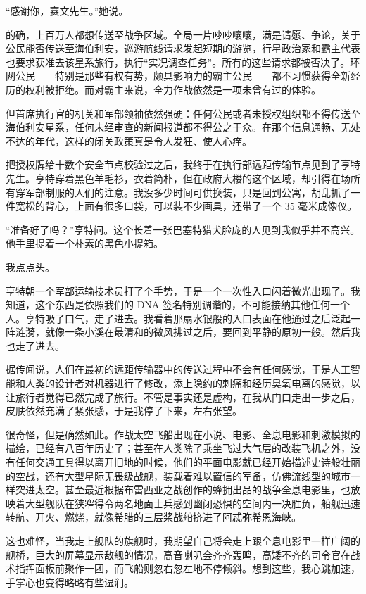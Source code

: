 \documentclass[AutoFakeBold=true]{book}
\begin{document}
``感谢你，赛文先生。''她说。

\vspace*{1em}

的确，上百万人都想传送至战争区域。全局一片吵吵嚷嚷，满是请愿、争论，关于公民能否传送至海伯利安，巡游航线请求发起短期的游览，行星政治家和霸主代表也要求获准去该星系旅行，执行``实况调查任务''。所有的这些请求都被否决了。环网公民——特别是那些有权有势，颇具影响力的霸主公民——都不习惯获得全新经历的权利被拒绝。而对霸主来说，全力作战依然是一项未曾有过的体验。

但首席执行官的机关和军部领袖依然强硬：任何公民或者未授权组织都不得传送至海伯利安星系，任何未经审查的新闻报道都不得公之于众。在那个信息通畅、无处不达的年代，这样的闭关政策真是令人发狂、使人心痒。

把授权牌给十数个安全节点校验过之后，我终于在执行部远距传输节点见到了亨特先生。亨特穿着黑色羊毛衫，衣着简朴，但在政府大楼的这个区域，却引得在场所有穿军部制服的人们的注意。我没多少时间可供换装，只是回到公寓，胡乱抓了一件宽松的背心，上面有很多口袋，可以装不少画具，还带了一个 35 毫米成像仪。

``准备好了吗？''亨特问。这个长着一张巴塞特猎犬脸庞的人见到我似乎并不高兴。他手里提着一个朴素的黑色小提箱。

我点点头。

亨特朝一个军部运输技术员打了个手势，于是一个一次性入口闪着微光出现了。我知道，这个东西是依照我们的 DNA 签名特别调谐的，不可能接纳其他任何一个人。亨特吸了口气，走了进去。我看着那扇水银般的入口表面在他通过之后泛起一阵涟漪，就像一条小溪在最清和的微风拂过之后，要回到平静的原初一般。然后我也走了进去。

据传闻说，人们在最初的远距传输器中的传送过程中不会有任何感觉，于是人工智能和人类的设计者对机器进行了修改，添上隐约的刺痛和经历臭氧电离的感觉，以让旅行者觉得已然完成了旅行。不管是事实还是虚构，在我从门口走出一步之后，皮肤依然充满了紧张感，于是我停了下来，左右张望。

很奇怪，但是确然如此。作战太空飞船出现在小说、电影、全息电影和刺激模拟的描绘，已经有八百年历史了；甚至在人类除了乘坐飞过大气层的改装飞机之外，没有任何交通工具得以离开旧地的时候，他们的平面电影就已经开始描述史诗般壮丽的空战，还有大型星际无畏级战舰，装载着难以置信的军备，仿佛流线型的城市一样突进太空。甚至最近根据布雷西亚之战创作的蜂拥出品的战争全息电影里，也放映着大型舰队在狭窄得令两名地面士兵感到幽闭恐惧的空间内一决胜负，船舰迅速转航、开火、燃烧，就像希腊的三层桨战船挤进了阿忒弥希恩海峡。

这也难怪，当我走上舰队的旗舰时，我期望自己将会走上跟全息电影里一样广阔的舰桥，巨大的屏幕显示敌舰的情况，高音喇叭会齐齐轰鸣，高矮不齐的司令官在战术指挥面板前聚作一团，而飞船则忽右忽左地不停倾斜。想到这些，我心跳加速，手掌心也变得略略有些湿润。
\end{document}

